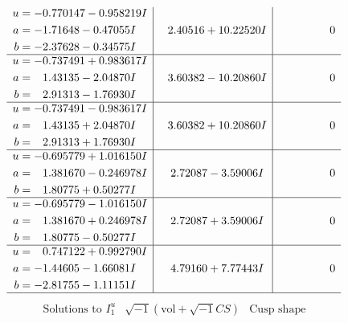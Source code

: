 \documentclass[1p]{elsarticle_modified}
\theoremstyle{definition}
\newcommand{\I}{\sqrt{-1}}
\begin{document}
$$\begin{array}{c|c|c}
\begin{aligned}
u &= -0.770147 - 0.958219 I \\
a &= -1.71648 - 0.47055 I \\
b &= -2.37628 - 0.34575 I\end{aligned}
 & \phantom{-}2.40516 + 10.22520 I & \phantom{-0.000000 } 0 \\ \hline\begin{aligned}
u &= -0.737491 + 0.983617 I \\
a &= \phantom{-}1.43135 - 2.04870 I \\
b &= \phantom{-}2.91313 - 1.76930 I\end{aligned}
 & \phantom{-}3.60382 - 10.20860 I & \phantom{-0.000000 } 0 \\ \hline\begin{aligned}
u &= -0.737491 - 0.983617 I \\
a &= \phantom{-}1.43135 + 2.04870 I \\
b &= \phantom{-}2.91313 + 1.76930 I\end{aligned}
 & \phantom{-}3.60382 + 10.20860 I & \phantom{-0.000000 } 0 \\ \hline\begin{aligned}
u &= -0.695779 + 1.016150 I \\
a &= \phantom{-}1.381670 - 0.246978 I \\
b &= \phantom{-}1.80775 + 0.50277 I\end{aligned}
 & \phantom{-}2.72087 - 3.59006 I & \phantom{-0.000000 } 0 \\ \hline\begin{aligned}
u &= -0.695779 - 1.016150 I \\
a &= \phantom{-}1.381670 + 0.246978 I \\
b &= \phantom{-}1.80775 - 0.50277 I\end{aligned}
 & \phantom{-}2.72087 + 3.59006 I & \phantom{-0.000000 } 0 \\ \hline\begin{aligned}
u &= \phantom{-}0.747122 + 0.992790 I \\
a &= -1.44605 - 1.66081 I \\
b &= -2.81755 - 1.11151 I\end{aligned}
 & \phantom{-}4.79160 + 7.77443 I & \phantom{-0.000000 } 0\\
 \hline 
 \end{array}$$\newpage$$\begin{array}{c|c|c}  
\text{Solutions to }I^u_{1}& \I (\text{vol} + \sqrt{-1}CS) & \text{Cusp shape}\\
 \hline 
\begin{aligned}

\end{aligned}
\end{array}$$
\end{document}
